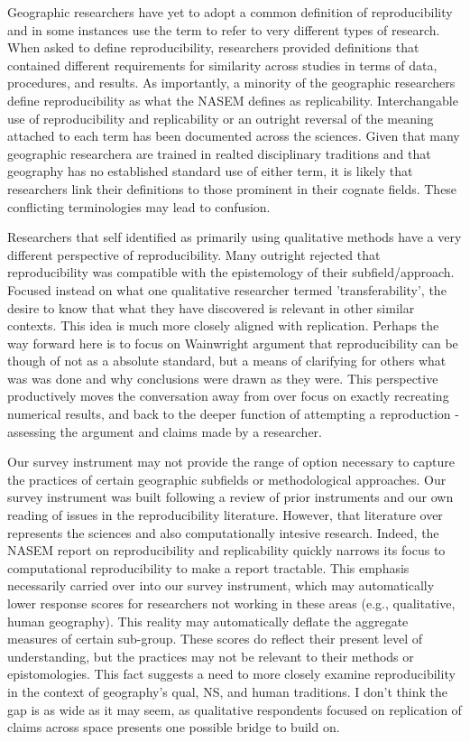 \documentclass[]{interact}
\theoremstyle{plain}%
\theoremstyle{definition}
\theoremstyle{remark}
\begin{document}
Geographic researchers have yet to adopt a common definition of reproducibility and in some instances use the term to refer to very different types of research.  
When asked to define reproducibility, researchers provided definitions that contained different requirements for similarity across studies in terms of data, procedures, and results. 
As importantly, a minority of the geographic researchers define reproducibility as what the NASEM defines as replicability.
Interchangable use of reproducibility and replicability or an outright reversal of the meaning attached to each term has been documented across the sciences. 
Given that many geographic researchera are trained in realted disciplinary traditions and that geography has no established standard use of either term, it is likely that researchers link their definitions to those prominent in their cognate fields. 
These conflicting terminologies may lead to confusion.

Researchers that self identified as primarily using qualitative methods have a very different perspective of reproducibility. 
Many outright rejected that reproducibility was compatible with the epistemology of their subfield/approach.
Focused instead on what one qualitative researcher termed 'transferability', the desire to know that what they have discovered is relevant in other similar contexts. 
This idea is much more closely aligned with replication. 
Perhaps the way forward here is to focus on Wainwright argument that reproducibility can be though of not as a absolute standard, but a means of clarifying for others what was was done and why conclusions were drawn as they were. 
This perspective productively moves the conversation away from over focus on exactly recreating numerical results, and back to the deeper function of attempting a reproduction - assessing the argument and claims made by a researcher. 

Our survey instrument may not provide the range of option necessary to capture the practices of certain geographic subfields or methodological approaches. 
Our survey instrument was built following a review of prior instruments and our own reading of issues in the reproducibility literature. 
However, that literature over represents the sciences and also computationally intesive research. 
Indeed, the NASEM report on reproducibility and replicability quickly narrows its focus to computational reproducibility to make a report tractable. 
This emphasis necessarily carried over into our survey instrument, which may automatically lower response scores for researchers not working in these areas (e.g., qualitative, human geography). 
This reality may automatically deflate the aggregate measures of certain sub-group.
These scores do reflect their present level of understanding, but the practices may not be relevant to their methods or epistomologies. 
This fact suggests a need to more closely examine reproducibility in the context of geography's qual, NS, and human traditions.
I don't think the gap is as wide as it may seem, as qualitative respondents focused on replication of claims across space presents one possible bridge to build on. 
\end{document}
